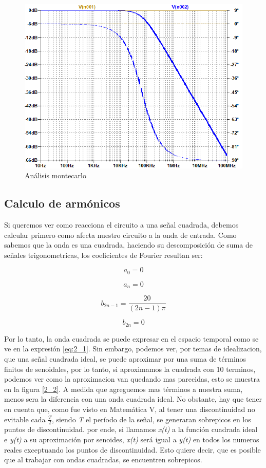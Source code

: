 \begin{figure}[h]
\begin{centering}
\includegraphics[scale=0.5]{resources2/montecarlo}
\par\end{centering}
\caption{Análisis montecarlo}
\label{2_5}
\end{figure}

\subsection{Calculo de armónicos}

Si queremos ver como reacciona el circuito a una señal cuadrada, debemos
calcular primero como afecta nuestro circuito a la onda de entrada.
Como sabemos que la onda es una cuadrada, haciendo su descomposición
de suma de señales trigonometricas, los coeficientes de Fourier resultan
ser:

\[
a_{0}=0
\]

\[
a_{n}=0
\]

\[
b_{2n-1}=\frac{20}{(2n-1)\pi}
\]

\[
b_{2n}=0
\]

Por lo tanto, la onda cuadrada se puede expresar en el espacio temporal
como se ve en la expresión \ref{eq:2_1}. Sin embargo, podemos ver,
por temas de idealizacion, que una señal cuadrada ideal, se puede
aproximar por una suma de términos finitos de senoidales, por lo tanto,
si aproximamos la cuadrada con 10 terminos, podemos ver como la aproximacion
van quedando mas parecidas, esto se muestra en la figura \ref{2_2}.
A medida que agreguemos mas términos a nuestra suma, menos sera la
diferencia con una onda cuadrada ideal. No obstante, hay que tener
en cuenta que, como fue visto en Matemática V, al tener una discontinuidad
no evitable cada $\frac{T}{2}$, siendo \emph{T} el período de la
señal, se generaran sobrepicos en los puntos de discontinuidad. por
ende, si llamamos \emph{x(t)} a la función cuadrada ideal e \emph{y(t)}
a su aproximación por senoides, \emph{x(t)} será igual a \emph{y(t)
}en todos los numeros reales exceptuando los puntos de discontinuidad.
Esto quiere decir, que es posible que al trabajar con ondas cuadradas,
se encuentren sobrepicos.

